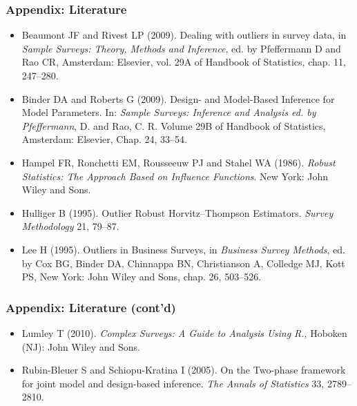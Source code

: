 \documentclass[framenumber,t]{beamer}
\begin{document}
\begin{frame}
    \frametitle{Appendix: Literature}
    {\footnotesize
    \begin{itemize}
        \setlength\itemsep{0.25em}
        \item \alert{Beaumont JF and Rivest LP (2009)}. Dealing with outliers
            in survey data, in \emph{Sample Surveys: Theory, Methods and
            Inference}, ed. by Pfeffermann D and Rao CR, Amsterdam: Elsevier,
            vol. 29A of Handbook of Statistics, chap. 11, 247–280.
        \item \alert{Binder DA and Roberts G (2009)}. Design- and Model-Based
            Inference for Model Parameters. In: \emph{Sample Surveys: Inference
            and Analysis ed. by Pfeffermann}, D. and Rao, C. R. Volume 29B
            of Handbook of Statistics, Amsterdam: Elsevier, Chap. 24, 33--54.
        \item \alert{Hampel FR, Ronchetti EM, Rousseeuw PJ and Stahel WA
            (1986)}.  \emph{Robust Statistics: The Approach Based on Influence
            Functions}.  New York: John Wiley and Sons.
        \item \alert{Hulliger B (1995)}. Outlier Robust Horvitz–Thompson
            Estimators.  \emph{Survey Methodology} 21, 79--87.
        \item \alert{Lee H (1995)}. Outliers in Business Surveys, in
            \emph{Business Survey Methods}, ed. by Cox BG,
            Binder DA, Chinnappa BN, Christianson A, Colledge MJ, Kott PS,
            New York: John Wiley and Sons, chap. 26, 503--526.
    \end{itemize}
    }
\end{frame}

\begin{frame}
    \frametitle{Appendix: Literature {\small (cont'd)}}
    {\footnotesize
    \begin{itemize}
        \setlength\itemsep{0.25em}
        \item \alert{Lumley T (2010)}. \emph{Complex Surveys: A Guide to
            Analysis Using R.}, Hoboken (NJ): John Wiley and Sons.
        \item \alert{Rubin-Bleuer S and Schiopu-Kratina I (2005)}. On the
            Two-phase framework for joint model and design-based inference.
            \emph{The Annals of Statistics} 33, 2789--2810.
    \end{itemize}
    }
\end{frame}


\end{document}
